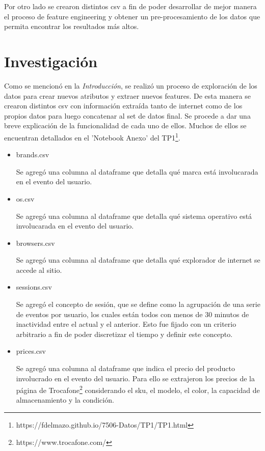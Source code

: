 \documentclass[a4paper]{article}
\begin{document}
Por otro lado se crearon distintos csv a fin de poder desarrollar de mejor manera el proceso de feature engineering y obtener un pre-procesamiento de los datos que permita encontrar los resultados más altos. 

\section{Investigación}

Como se mencionó en la \textit{Introducción}, se realizó un proceso de exploración de los datos para crear nuevos atributos y extraer nuevos features. De esta manera se crearon distintos csv con información extraída tanto de internet como de los propios datos para luego concatenar al set de datos final. Se procede a dar una breve explicación de la funcionalidad de cada uno de ellos. Muchos de ellos se encuentran detallados en el 'Notebook Anexo' del TP1\footnote{https://fdelmazo.github.io/7506-Datos/TP1/TP1.html}.

\begin{itemize}
	\item brands.csv

Se agregó una columna al dataframe que detalla qué marca está involucarada en el evento del usuario.

	\item {os.csv}
	
Se agregó una columna al dataframe que detalla qué sistema operativo está involucarada en el evento del usuario.

	\item{browsers.csv}

Se agregó una columna al dataframe que detalla qué explorador de internet se accede al sitio.	

	\item{sessions.csv}

Se agregó el concepto de sesión, que se define como la agrupación de una serie de eventos por usuario, los cuales están todos con menos de 30 minutos de
inactividad entre el actual y el anterior. Esto fue fijado con un criterio arbitrario a fin de poder discretizar el tiempo y definir este concepto.

	\item{prices.csv}

Se agregó una columna al dataframe que indica el precio del producto involucrado en el evento del usuario. Para ello se extrajeron los precios de la página de Trocafone\footnote{https://www.trocafone.com/} considerando el sku, el modelo, el color, la capacidad de almacenamiento y la condición.
\end{itemize}
\end{document}
